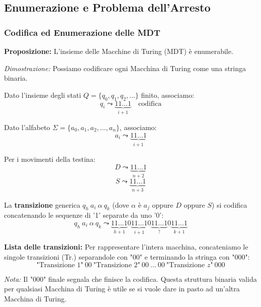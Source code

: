 \subsection{Enumerazione e Problema dell'Arresto}

\subsubsection{Codifica ed Enumerazione delle MDT}

\vspace{0.4cm}
\textbf{Proposizione:} L'insieme delle Macchine di Turing (MDT) è enumerabile.

\vspace{0.2cm}
\textit{Dimostrazione:} Possiamo codificare ogni Macchina di Turing come una stringa binaria.

Dato l'insieme degli stati $Q = \{q_0, q_1, q_2, \dots\}$ finito, associamo:
$$q_i \leadsto \underbrace{11\dots1}_{i+1} \quad \text{codifica}$$

Dato l'alfabeto $\Sigma = \{a_0, a_1, a_2, \dots, a_n\}$, associamo:
$$a_i \leadsto \underbrace{11\dots1}_{i+1}$$

Per i movimenti della testina:
$$D \leadsto \underbrace{11\dots1}_{n+2}$$
$$S \leadsto \underbrace{11\dots1}_{n+3}$$

La \textbf{transizione} generica $q_h \ a_i \ \alpha \ q_k$ (dove $\alpha$ è $a_j$ oppure $D$ oppure $S$) si codifica concatenando le sequenze di '1' separate da uno '0':
$$q_h \ a_i \ \alpha \ q_k \leadsto \underbrace{11\dots1}_{h+1} 0 \underbrace{11\dots1}_{i+1} 0 \underbrace{11\dots1}_{?} 0 \underbrace{11\dots1}_{k+1}$$

\vspace{0.4cm}
\textbf{Lista delle transizioni:} 
Per rappresentare l'intera macchina, concateniamo le singole transizioni (Tr.) separandole con "00" e terminando la stringa con "000":
$$ \text{"Transizione 1"} \ 00 \ \text{"Transizione 2"} \ 00 \ \dots \ 00 \ \text{"Transizione } z\text{"} \ 000 $$

\textit{Nota:} Il "000" finale segnala che finisce la codifica. Questa struttura binaria valida per qualsiasi Macchina di Turing è utile se si vuole dare in pasto ad un'altra Macchina di Turing.

